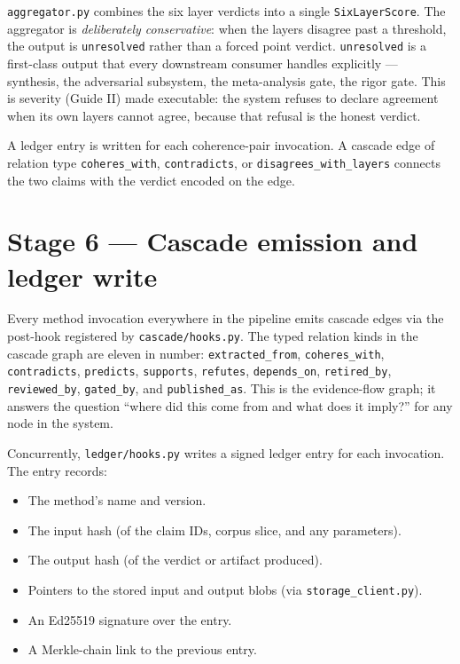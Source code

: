 \documentclass[11pt,letterpaper]{article}
\newcommand{\file}[1]{\texttt{#1}}
\begin{document}
\file{aggregator.py} combines the six layer verdicts into a single \texttt{SixLayerScore}. The aggregator is \emph{deliberately conservative}: when the layers disagree past a threshold, the output is \texttt{unresolved} rather than a forced point verdict. \texttt{unresolved} is a first-class output that every downstream consumer handles explicitly --- synthesis, the adversarial subsystem, the meta-analysis gate, the rigor gate. This is severity (Guide II) made executable: the system refuses to declare agreement when its own layers cannot agree, because that refusal is the honest verdict.

A ledger entry is written for each coherence-pair invocation. A cascade edge of relation type \texttt{coheres\_with}, \texttt{contradicts}, or \texttt{disagrees\_with\_layers} connects the two claims with the verdict encoded on the edge.

\section{Stage 6 --- Cascade emission and ledger write}

Every method invocation everywhere in the pipeline emits cascade edges via the post-hook registered by \file{cascade/hooks.py}. The typed relation kinds in the cascade graph are eleven in number: \texttt{extracted\_from}, \texttt{coheres\_with}, \texttt{contradicts}, \texttt{predicts}, \texttt{supports}, \texttt{refutes}, \texttt{depends\_on}, \texttt{retired\_by}, \texttt{reviewed\_by}, \texttt{gated\_by}, and \texttt{published\_as}. This is the evidence-flow graph; it answers the question ``where did this come from and what does it imply?'' for any node in the system.

Concurrently, \file{ledger/hooks.py} writes a signed ledger entry for each invocation. The entry records:

\begin{itemize}[leftmargin=1.5em,itemsep=0.1em]
\item The method's name and version.
\item The input hash (of the claim IDs, corpus slice, and any parameters).
\item The output hash (of the verdict or artifact produced).
\item Pointers to the stored input and output blobs (via \file{storage\_client.py}).
\item An Ed25519 signature over the entry.
\item A Merkle-chain link to the previous entry.
\end{itemize}
\end{document}
